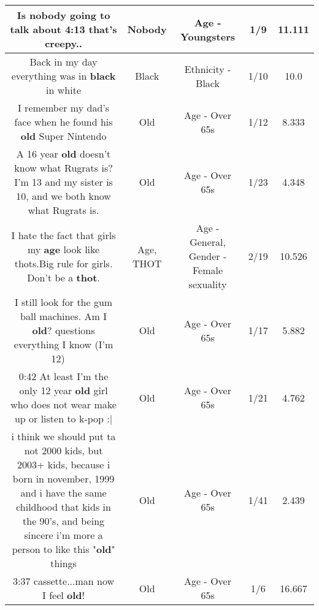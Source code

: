 \documentclass[11pt]{article}
\newlength\mylength
\begin{document}
\begin{center}
\begin{longtable}{|C{.65\mylength}|C{.30\mylength}|C{.12\mylength}|C{.12\mylength}|C{.12\mylength}|}
  \small Is \textbf{nobody} going to talk about 4:13 that's creepy..\normalsize   & Nobody & Age - Youngsters & 1/9 & 11.111 \\  \hline
  \small Back in my day everything was in \textbf{black} in white\normalsize   & Black & Ethnicity - Black & 1/10 & 10.0 \\  \hline
  \small I remember my dad's face when he found his \textbf{old} Super Nintendo\normalsize   & Old & Age - Over 65s & 1/12 & 8.333 \\  \hline
  \small A 16 year \textbf{old} doesn't know what Rugrats is?I'm 13 and my sister is 10, and we both know what Rugrats is.\normalsize   & Old & Age - Over 65s & 1/23 & 4.348 \\  \hline
  \small I hate the fact that girls my \textbf{age} look like thots.Big rule for girls. Don't be a \textbf{thot}.\normalsize   & Age, THOT & Age - General, Gender - Female sexuality & 2/19 & 10.526 \\  \hline
  \small I still look for the gum ball machines. Am I \textbf{old}? questions everything I know (I'm 12)🤦🏽‍♀️😂\normalsize   & Old & Age - Over 65s & 1/17 & 5.882 \\  \hline
  \small 0:42 At least I'm the only 12 year \textbf{old} girl who does not wear make up or listen to k-pop :|\normalsize   & Old & Age - Over 65s & 1/21 & 4.762 \\  \hline
  \small i think we should put ta not 2000 kids, but 2003+ kids, because i born in november, 1999 and i have the same childhood that kids in the 90's, and being sincere i'm more a person to like this "\textbf{old}" things\normalsize   & Old & Age - Over 65s & 1/41 & 2.439 \\  \hline
  \small 3:37 cassette...man now I feel \textbf{old}!\normalsize   & Old & Age - Over 65s & 1/6 & 16.667 \\  \hline

\end{longtable}
\end{center}
\end{document}
